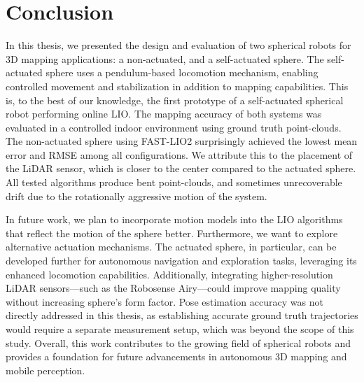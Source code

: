 \documentclass[english, bachelor, utf8]{base/thesis_telematics}
\begin{document}
\chapter{Conclusion}
In this thesis, we presented the design and evaluation of two spherical robots for 3D mapping applications: a non-actuated, and a self-actuated sphere. 
The self-actuated sphere uses a pendulum-based locomotion mechanism, enabling controlled movement and stabilization in addition to mapping capabilities.
This is, to the best of our knowledge, the first prototype of a self-actuated spherical robot performing online LIO.   
The mapping accuracy of both systems was evaluated in a controlled indoor environment using ground truth point-clouds. 
The non-actuated sphere using FAST-LIO2 surprisingly achieved the lowest mean error and RMSE among all configurations.
We attribute this to the placement of the LiDAR sensor, which is closer to the center compared to the actuated sphere.
All tested algorithms produce bent point-clouds, and sometimes unrecoverable drift due to the rotationally aggressive motion of the system.  

In future work, we plan to incorporate motion models into the LIO algorithms that reflect the motion of the sphere better.
Furthermore, we want to explore alternative actuation mechanisms.
The actuated sphere, in particular, can be developed further for autonomous navigation and exploration tasks, leveraging its enhanced locomotion capabilities. 
Additionally, integrating higher-resolution LiDAR sensors—such as the Robosense Airy—could improve mapping quality without increasing sphere's form factor. 
Pose estimation accuracy was not directly addressed in this thesis, as establishing accurate ground truth trajectories would require a separate measurement setup, which was beyond the scope of this study.
Overall, this work contributes to the growing field of spherical robots and provides a foundation for future advancements in autonomous 3D mapping and mobile perception.
\end{document}
